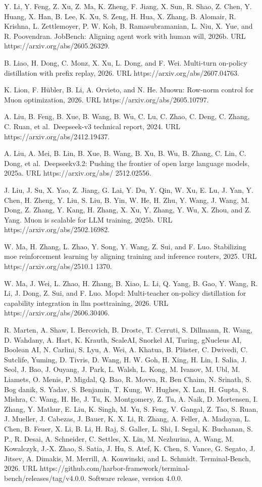 \documentclass[
  10
]{article}
\begin{document}
Y. Li, Y. Feng, Z. Xu, Z. Ma, K. Zheng, F. Jiang, X. Sun, R. Shao, Z.
Chen, Y. Huang, X. Han, B. Lee, K. Xu, S. Zeng, H. Hua, X. Zhang, B.
Alomair, R. Krishna, L. Zettlemoyer, P. W. Koh, B. Ramasubramanian, L.
Niu, X. Yue, and R. Poovendran. JobBench: Aligning agent work with human
will, 2026b. URL https://arxiv.org/abs/2605.26329.

B. Liao, H. Dong, C. Monz, X. Xu, L. Dong, and F. Wei. Multi-turn
on-policy distillation with prefix replay, 2026. URL
https://arxiv.org/abs/2607.04763.

K. Lion, F. Hübler, B. Li, A. Orvieto, and N. He. Muown: Row-norm
control for Muon optimization, 2026. URL
https://arxiv.org/abs/2605.10797.

A. Liu, B. Feng, B. Xue, B. Wang, B. Wu, C. Lu, C. Zhao, C. Deng, C.
Zhang, C. Ruan, et al.~Deepseek-v3 technical report, 2024. URL
https://arxiv.org/abs/2412.19437.

A. Liu, A. Mei, B. Lin, B. Xue, B. Wang, B. Xu, B. Wu, B. Zhang, C. Lin,
C. Dong, et al.~Deepseekv3.2: Pushing the frontier of open large
language models, 2025a. URL https://arxiv.org/abs/ 2512.02556.

J. Liu, J. Su, X. Yao, Z. Jiang, G. Lai, Y. Du, Y. Qin, W. Xu, E. Lu, J.
Yan, Y. Chen, H. Zheng, Y. Liu, S. Liu, B. Yin, W. He, H. Zhu, Y. Wang,
J. Wang, M. Dong, Z. Zhang, Y. Kang, H. Zhang, X. Xu, Y. Zhang, Y. Wu,
X. Zhou, and Z. Yang. Muon is scalable for LLM training, 2025b. URL
https://arxiv.org/abs/2502.16982.

W. Ma, H. Zhang, L. Zhao, Y. Song, Y. Wang, Z. Sui, and F. Luo.
Stabilizing moe reinforcement learning by aligning training and
inference routers, 2025. URL https://arxiv.org/abs/2510.1 1370.

W. Ma, J. Wei, L. Zhao, H. Zhang, B. Xiao, L. Li, Q. Yang, B. Gao, Y.
Wang, R. Li, J. Dong, Z. Sui, and F. Luo. Mopd: Multi-teacher on-policy
distillation for capability integration in llm posttraining, 2026. URL
https://arxiv.org/abs/2606.30406.

R. Marten, A. Shaw, I. Bercovich, B. Droste, T. Cerruti, S. Dillmann, R.
Wang, D. Wahdany, A. Hart, K. Krauth, ScaleAI, Snorkel AI, Turing,
gNucleus AI, Boolean AI, N. Carlini, S. Lyu, A. Wei, A. Khatua, B.
Plüster, C. Dwivedi, C. Sutclife, Yuming, D. Tivris, D. Wang, H. W. Goh,
H. Xing, H. Lin, I. Salia, J. Seol, J. Bao, J. Ouyang, J. Park, L.
Walsh, L. Kong, M. Ivanov, M. Ubl, M. Liamets, O. Menis, P. Migdal, Q.
Bao, R. Movva, R. Ben Chaim, N. Srinath, S. Bog danik, S. Yadav, S.
Benjamin, T. Kung, W. Hughes, X. Lan, H. Gupta, S. Mishra, C. Wang, H.
He, J. Tu, K. Montgomery, Z. Tu, A. Naik, D. Mortensen, I. Zhang, Y.
Mathur, E. Liu, K. Singh, M. Yu, S. Feng, V. Gangal, Z. Tao, S. Ruan, J.
Mueller, J. Cabezas, J. Bauer, K. X. Li, R. Zhang, A. Feller, A.
Madayan, L. Chen, B. Feuer, X. Li, B. Li, H. Raj, S. Galler, L. Shi, I.
Segal, K. Buchanan, S. P., R. Desai, A. Schneider, C. Settles, X. Lin,
M. Nezhurina, A. Wang, M. Kowalczyk, J.-X. Zhao, S. Satia, J. Hu, S.
Atef, K. Chen, S. Vance, G. Segato, J. Jitsev, A. Dimakis, M. Merrill,
A. Konwinski, and L. Schmidt. Terminal-Bench, 2026. URL
https://github.com/harbor-framework/terminal-bench/releases/tag/v4.0.0.
Software release, version 4.0.0.
\end{document}
